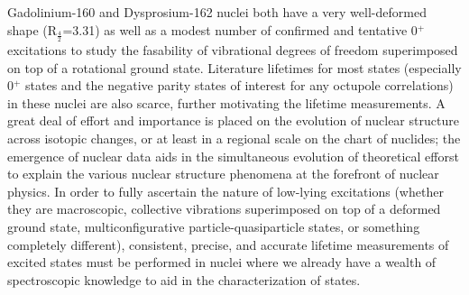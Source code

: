 Gadolinium-160 and Dysprosium-162 nuclei both have a very well-deformed shape (R$_\frac{4}{2}$=3.31) as well as a modest number of confirmed and tentative 0$^+$ excitations to study the fasability of vibrational degrees of freedom superimposed on top of a rotational ground state. Literature lifetimes for most states (especially 0$^+$ states and the negative parity states of interest for any octupole correlations) in these nuclei are also scarce, further motivating the lifetime measurements. A great deal of effort and importance is placed on the evolution of nuclear structure across isotopic changes, or at least in a regional scale on the chart of nuclides; the emergence of nuclear data aids in the simultaneous evolution of theoretical efforst to explain the various nuclear structure phenomena at the forefront of nuclear physics. In order to fully ascertain the nature of low-lying excitations (whether they are macroscopic, collective vibrations superimposed on top of a deformed ground state, multiconfigurative particle-quasiparticle states, or something completely different), consistent, precise, and accurate lifetime measurements of excited states must be performed in nuclei where we already have a wealth of spectroscopic knowledge to aid in the characterization of states. 

